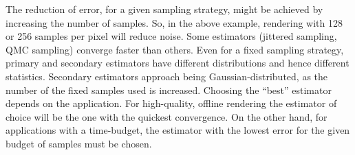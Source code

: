 The reduction of error, for a given sampling strategy, might be achieved by increasing the number of samples. So, in the above example, rendering with 128 or 256 samples per pixel will reduce noise. 
Some estimators (jittered sampling, QMC sampling) converge faster than others. Even for a fixed sampling strategy, primary and secondary estimators have different distributions and hence different statistics. Secondary estimators approach being Gaussian-distributed, as the number of the fixed samples used is increased. Choosing the ``best'' estimator depends on the application. For high-quality, offline rendering the estimator of choice will be the one with the quickest convergence. On the other hand, for applications with a time-budget, the estimator with the lowest error for the given budget of samples must be chosen.



